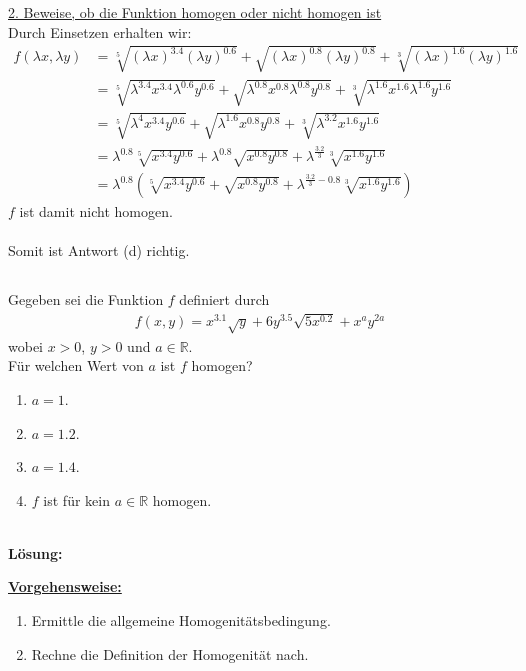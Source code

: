 \underline{2. Beweise, ob die Funktion homogen oder nicht homogen ist}\\
Durch Einsetzen erhalten wir:
\begin{align*}
f( \lambda x, \lambda y ) 
&= \sqrt[5]{(\lambda x)^{3.4} (\lambda y)^{0.6}}
  + \sqrt{(\lambda x)^{0.8} (\lambda y)^{0.8}}
  + \sqrt[3]{(\lambda x)^{1.6} (\lambda y)^{1.6}}\\
&=  \sqrt[5]{\lambda^{3.4} x^{3.4} \lambda^{0.6} y^{0.6}}
  + \sqrt{\lambda^{0.8} x^{0.8} \lambda^{0.8} y^{0.8}}
  + \sqrt[3]{\lambda^{1.6} x^{1.6} \lambda^{1.6} y^{1.6}}\\
&=  \sqrt[5]{\lambda^{4} x^{3.4} y^{0.6}}
  + \sqrt{\lambda^{1.6} x^{0.8}  y^{0.8}}
  + \sqrt[3]{\lambda^{3.2} x^{1.6} y^{1.6}}\\
&=  \lambda^{0.8} \sqrt[5]{ x^{3.4} y^{0.6}}
  + \lambda^{0.8} \sqrt{ x^{0.8}  y^{0.8}}
  + \lambda^{\frac{3.2}{3}} \sqrt[3]{ x^{1.6} y^{1.6}}\\
&=  \lambda^{0.8} \left( \sqrt[5]{ x^{3.4} y^{0.6}}
  + \sqrt{ x^{0.8}  y^{0.8}}
  + \lambda^{\frac{3.2}{3} -0.8} \sqrt[3]{ x^{1.6} y^{1.6}} \right)
\end{align*}
$f$ ist damit nicht homogen.\\
\\
Somit ist Antwort (d) richtig.
 
\newpage

\subsection*{}
Gegeben sei die Funktion $f$ definiert durch
\begin{align*}
f(x,y) = x^{3.1} \sqrt{y} + 6 y^{3.5} \sqrt{ 5 x^{0.2}}
		+ x^a y^{2a}
\end{align*}
wobei $x > 0 $, $ y >0 $ und $a \in \mathbb{R}$.\\
Für welchen Wert von $a$ ist $f$ homogen?
\renewcommand{\labelenumi}{(\alph{enumi})}
\begin{enumerate}
\item $a = 1$.
\item $a = 1.2$.
\item $a = 1.4$.
\item $f$ ist für kein $a \in \mathbb{R}$ homogen.
	
\end{enumerate}
\ \\
\textbf{Lösung:}
\begin{mdframed}
\underline{\textbf{Vorgehensweise:}}
\renewcommand{\labelenumi}{\theenumi.}
\begin{enumerate}
\item Ermittle die allgemeine Homogenitätsbedingung.
\item Rechne die Definition der Homogenität nach.
\end{enumerate}
\end{mdframed}

